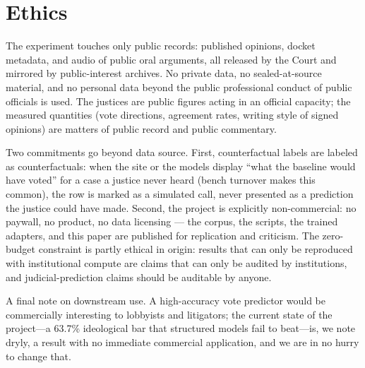 \section{Ethics}\label{sec:ethics}

The experiment touches only public records: published opinions,
docket metadata, and audio of public oral arguments, all released
by the Court and mirrored by public-interest archives. No private
data, no sealed-at-source material, and no personal data beyond
the public professional conduct of public officials is used. The
justices are public figures acting in an official capacity; the
measured quantities (vote directions, agreement rates, writing
style of signed opinions) are matters of public record and public
commentary.

Two commitments go beyond data source. First, counterfactual
labels are labeled as counterfactuals: when the site or the models
display ``what the baseline would have voted'' for a case a
justice never heard (bench turnover makes this common), the row is
marked as a simulated call, never presented as a prediction the
justice could have made. Second, the project is explicitly
non-commercial: no paywall, no product, no data licensing ---
the corpus, the scripts, the trained adapters, and this paper are
published for replication and criticism. The zero-budget
constraint is partly ethical in origin: results that can only be
reproduced with institutional compute are claims that can only be
audited by institutions, and judicial-prediction claims should be
auditable by anyone.

A final note on downstream use. A high-accuracy vote predictor
would be commercially interesting to lobbyists and litigators; the
current state of the project---a 63.7\% ideological bar that
structured models fail to beat---is, we note dryly, a result
with no immediate commercial application, and we are in no hurry
to change that.
